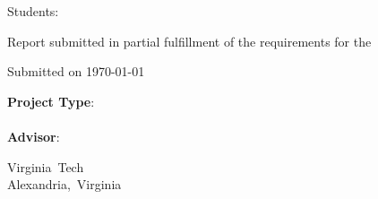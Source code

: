 
\newcommand{\condBreak}[1]{\ifx#1\empty\else \\ \fi }

\begin{titlepage}
    \begin{center}
        {\huge \bf \projTitle}
        \vspace{.3in}

        {\Large{Students: \projAuthorOneName}}
        \vspace{.2in}

        \vspace{1.0in}

        {Report submitted in partial fulfillment of the requirements for the \prog}

        \vspace{0.3in}
        {Submitted on \today}

        \vspace{0.5in}

        \textbf{Project Type}: \btptrack\\
        \quad\\
        {\textbf{Advisor}: \advisorone}

        \vfill

        {Virginia Tech \\ Alexandria, Virginia}

    \end{center}
\end{titlepage}

